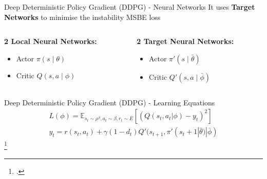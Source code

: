 \documentclass[aspectratio=169]{beamer}
\begin{document}
\begin{frame}{Deep Deterministic Policy Gradient (DDPG) - Neural Networks}
	\centering
	It uses \textbf{Target Networks} to minimise the instability MSBE loss
	\vspace{10mm}
	\begin{columns}
		\begin{column}{0.5\linewidth}
			\textbf{2 Local Neural Networks:}
			\begin{itemize}
				\item Actor $\pi(s \;|\; \theta)$
				\item Critic $Q(s, a \;|\; \phi)$
			\end{itemize}
		\end{column}
		\begin{column}{0.5\textwidth}
			\textbf{2 Target Neural Networks:}
			\begin{itemize}
				\item Actor $\pi'(s \;|\; \bar{\theta})$
				\item Critic $Q'(s, a \;|\; \bar{\phi})$
			\end{itemize}
		\end{column}
	\end{columns}
\end{frame}

\begin{frame}{Deep Deterministic Policy Gradient (DDPG) - Learning Equations}
	\centering
	\Large
	\begin{equation}\label{eq:ddpgloss}
		\begin{gathered}
			L(\phi) = \mathbb{E}_{s_t\sim \rho^\beta, a_t\sim \beta,r_t\sim E}[(Q(s_t, a_t|\phi)-y_t)^2] \\
			y_t = r(s_t, a_t) + \gamma (1-d_t)Q'(s_{t+1}, \pi'(s_t+1|\bar{\theta})|\bar{\phi})
		\end{gathered}
	\end{equation}
	\footcite*{lillicrap2015continuous}
\end{frame}
\end{document}
